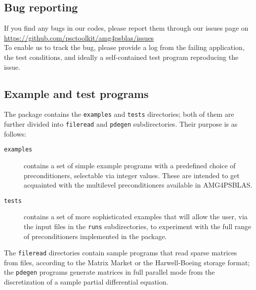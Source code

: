 \subsection{Bug reporting}
If you find any bugs in our codes, please report them through our
issues page on \\[2mm]
\url{https://github.com/psctoolkit/amg4psblas/issues}\\

To enable us to track the bug, please provide a log from the failing
application, the test conditions, and ideally a self-contained test
program reproducing the issue.

\subsection{Example and test programs\label{sec:ex_and_test}}
The package contains the \verb|examples| and \verb|tests| directories;
both of them are further divided into \verb|fileread| and
\verb|pdegen| subdirectories. Their purpose is as follows:
\begin{description}
\item[\tt examples] contains a set of simple example programs with a
  predefined choice of preconditioners, selectable via integer
  values. These are intended to get  acquainted with the
  multilevel preconditioners available in AMG4PSBLAS.
\item[\tt tests] contains a set of more sophisticated examples that
  will allow the user, via the input files in the \verb|runs|
  subdirectories, to experiment with the full range of preconditioners
  implemented in the package.
\end{description}
The \verb|fileread| directories contain sample programs that read
sparse matrices from files, according to the Matrix Market or the
Harwell-Boeing storage format; the \verb|pdegen| programs generate
matrices in full parallel mode from the discretization of a sample partial
differential equation.
